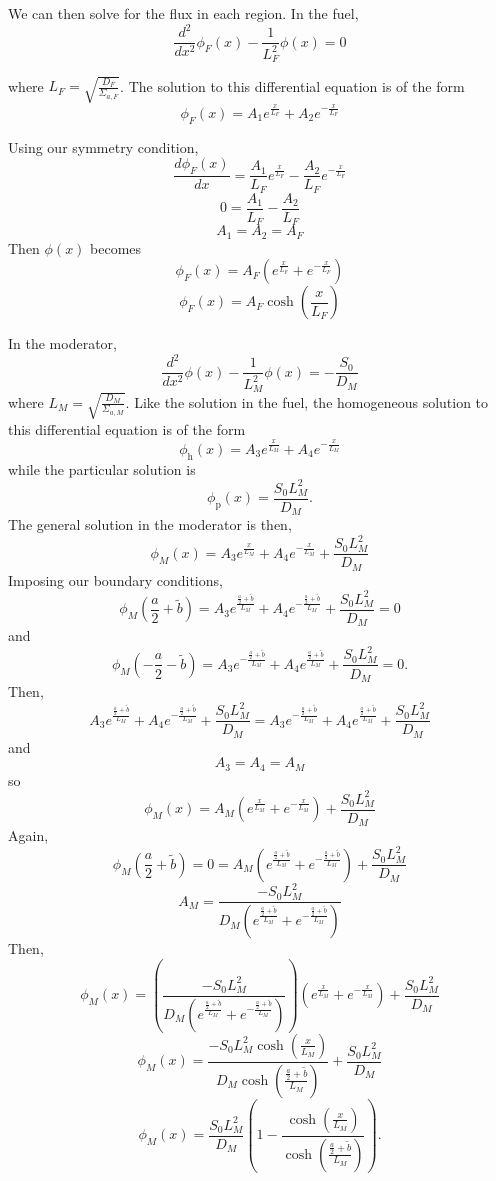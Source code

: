 \documentclass{article}
\newcommand{\Xs}{\Sigma}
\begin{document}
We can then solve for the flux in each region. In the fuel,
$$ \frac{d^2}{dx^2}\phi_F(x) - \frac{1}{L_F^2}\phi(x) = 0 $$

where $L_F = \sqrt{\frac{D_F}{\Xs_{a,F}}}$. The solution to this differential equation is of the form
$$ \phi_F(x) = A_1 e^{\frac{x}{L_F}} + A_2 e^{-\frac{x}{L_F}} $$

Using our symmetry condition,
$$ \frac{d\phi_F(x)}{dx} = \frac{A_1}{L_F}e^{\frac{x}{L_F}} - \frac{A_2}{L_F} e^{-\frac{x}{L_F}} $$
$$ 0 = \frac{A_1}{L_F} - \frac{A_2}{L_F} $$
$$ A_1 = A_2 = A_F $$
Then $\phi(x)$ becomes
$$ \phi_F(x) = A_F \left(e^{\frac{x}{L_F}} + e^{-\frac{x}{L_F}}\right) $$
$$ \phi_F(x) = A_F \cosh\left(\frac{x}{L_F}\right) $$


In the moderator,
$$ \frac{d^2}{dx^2}\phi(x) - \frac{1}{L_M^2}\phi(x) = -\frac{S_0}{D_M} $$
where $L_M = \sqrt{\frac{D_M}{\Xs_{a,M}}}$. Like the solution in the fuel, the homogeneous solution to this differential equation is of the form
$$ \phi_{\text{h}}(x) = A_3 e^{\frac{x}{L_M}} + A_4 e^{-\frac{x}{L_M}} $$
while the particular solution is
$$ \phi_{\text{p}}(x) = \frac{S_0 L_M^2}{D_M} .$$
The general solution in the moderator is then,
$$ \phi_M(x) = A_3 e^{\frac{x}{L_M}} + A_4 e^{-\frac{x}{L_M}} + \frac{S_0 L_M^2}{D_M} $$
Imposing our boundary conditions,
$$ \phi_M(\frac{a}{2}+\tilde{b}) = A_3 e^{\frac{\frac{a}{2}+\tilde{b}}{L_M}} + A_4 e^{-\frac{\frac{a}{2}+\tilde{b}}{L_M}} + \frac{S_0 L_M^2}{D_M} = 0 $$
and 
$$ \phi_M(-\frac{a}{2}-\tilde{b}) = A_3 e^{-\frac{\frac{a}{2}+\tilde{b}}{L_M}} + A_4 e^{\frac{\frac{a}{2}+\tilde{b}}{L_M}} + \frac{S_0 L_M^2}{D_M} = 0 .$$
Then,
$$ A_3 e^{\frac{\frac{a}{2}+\tilde{b}}{L_M}} + A_4 e^{-\frac{\frac{a}{2}+\tilde{b}}{L_M}} + \frac{S_0 L_M^2}{D_M} = A_3 e^{-\frac{\frac{a}{2}+\tilde{b}}{L_M}} + A_4 e^{\frac{\frac{a}{2}+\tilde{b}}{L_M}} + \frac{S_0 L_M^2}{D_M} $$
and
$$ A_3 = A_4 = A_M$$
so
$$ \phi_M(x) = A_M \left( e^{\frac{x}{L_M}} + e^{-\frac{x}{L_M}} \right) + \frac{S_0 L_M^2}{D_M} $$
Again, 
$$ \phi_M(\frac{a}{2}+\tilde{b}) = 0 = A_M \left( e^{\frac{\frac{a}{2}+\tilde{b}}{L_M}} + e^{-\frac{\frac{a}{2}+\tilde{b}}{L_M}} \right) + \frac{S_0 L_M^2}{D_M}$$
$$ A_M = \frac{-S_0 L_M^2}{D_M \left( e^{\frac{\frac{a}{2}+\tilde{b}}{L_M}} + e^{-\frac{\frac{a}{2}+\tilde{b}}{L_M}}\right)} $$
Then,
$$ \phi_M(x) = \left(\frac{-S_0 L_M^2}{D_M \left( e^{\frac{\frac{a}{2}+\tilde{b}}{L_M}} + e^{-\frac{\frac{a}{2}+\tilde{b}}{L_M}}\right)}\right) \left( e^{\frac{x}{L_M}} + e^{-\frac{x}{L_M}} \right) + \frac{S_0 L_M^2}{D_M} $$
$$ \phi_M(x) = \frac{-S_0 L_M^2 \cosh\left(\frac{x}{L_M}\right)}{D_M \cosh\left(\frac{\frac{a}{2}+\tilde{b}}{L_M}\right)} + \frac{S_0 L_M^2}{D_M} $$
$$\boxed{ \phi_M(x) = \frac{S_0 L_M^2}{D_M}\left( 1 - \frac{\cosh\left(\frac{x}{L_M}\right)}{\cosh\left(\frac{\frac{a}{2}+\tilde{b}}{L_M}\right)}\right) }.$$
\end{document}
